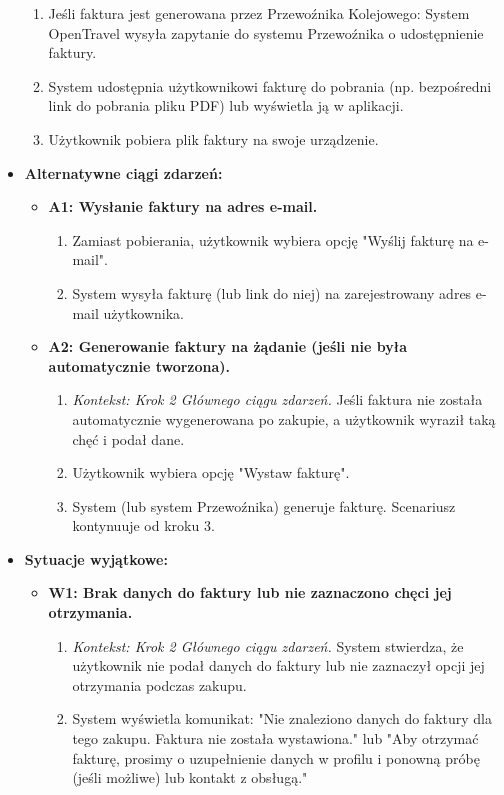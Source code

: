 \documentclass[a4paper,12pt]{article}
\begin{document}
\begin{itemize}
\begin{enumerate}
\item Jeśli faktura jest generowana przez Przewoźnika Kolejowego: System OpenTravel wysyła zapytanie do systemu Przewoźnika o udostępnienie faktury.
\item System udostępnia użytkownikowi fakturę do pobrania (np. bezpośredni link do pobrania pliku PDF) lub wyświetla ją w aplikacji.
\item Użytkownik pobiera plik faktury na swoje urządzenie.
\end{enumerate}
\item \textbf{Alternatywne ciągi zdarzeń:}
\begin{itemize}
\item \textbf{A1: Wysłanie faktury na adres e-mail.}
\begin{enumerate}
\item Zamiast pobierania, użytkownik wybiera opcję "Wyślij fakturę na e-mail".
\item System wysyła fakturę (lub link do niej) na zarejestrowany adres e-mail użytkownika.
\end{enumerate}
\item \textbf{A2: Generowanie faktury na żądanie (jeśli nie była automatycznie tworzona).}
\begin{enumerate}
\item \textit{Kontekst: Krok 2 Głównego ciągu zdarzeń.} Jeśli faktura nie została automatycznie wygenerowana po zakupie, a użytkownik wyraził taką chęć i podał dane.
\item Użytkownik wybiera opcję "Wystaw fakturę".
\item System (lub system Przewoźnika) generuje fakturę. Scenariusz kontynuuje od kroku 3.
\end{enumerate}
\end{itemize}
\item \textbf{Sytuacje wyjątkowe:}
\begin{itemize}
\item \textbf{W1: Brak danych do faktury lub nie zaznaczono chęci jej otrzymania.}
\begin{enumerate}
\item \textit{Kontekst: Krok 2 Głównego ciągu zdarzeń.} System stwierdza, że użytkownik nie podał danych do faktury lub nie zaznaczył opcji jej otrzymania podczas zakupu.
\item System wyświetla komunikat: "Nie znaleziono danych do faktury dla tego zakupu. Faktura nie została wystawiona." lub "Aby otrzymać fakturę, prosimy o uzupełnienie danych w profilu i ponowną próbę (jeśli możliwe) lub kontakt z obsługą."

\end{enumerate}
\end{itemize}
\end{itemize}
\end{document}
